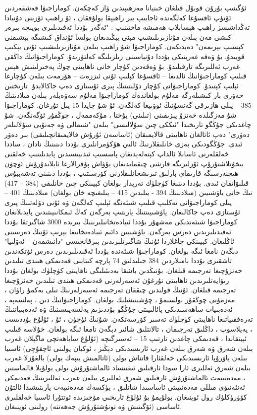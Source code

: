 \documentclass[a4paper]{article}
\begin{document}
ئۆگىنىپ بۇرۇن قوبۇل قىلغان خىنيانا مەزھىپىدىن ۋاز كەچكەن. كوماراجىۋا قەشقەردىن ئۆتۈپ ئاقسۇغا كەلگەندە ئاجايىپ بىر راھىپقا يولۇققان ، ئۇ راھىپ ئۆزىنى دۇنيادا تەڭداشىسز راھىپ ھېسابلاب ھەمىشە ماختىنىپ : "ئەگەر بۇددا ئەقىدىلىرى بويىچە بىرەر كىشى مەن بىلەن مۇنازىرىلىشىپ مېنى يېڭىدىغان بولسا ئۇنداق كىشىگە بېشىمنى كېسىپ بېرىمەن" دەيدىكەن. كوماراجىۋا شۇ راھىپ بىلەن مۇنازىرىلىشىپ ئۇنى يېڭىپ قويىدۇ. بۇ ۋەقە غەربتىكى بۇددا دۇنياسىنى زىلزىلىگە كەلتۈرىدۇ. كوماراجىۋانىڭ داڭقى غەرب ئەللىرىگە تارقىلىدۇ. بۇ ۋەقەدىن كۇچار خانى ناھايىتى چوڭ پەخىرلىنىش ھېس قىلىپ كوماراجىۋانىڭ ئالدىغا – ئاقسۇغا كېلىپ ئۇنى ئىززەت – ھۆرمەت بىلەن كۇچارغا ئېلىپ كېتىدۇ. كوماراجىۋانى كۇچار دۆلىتىنىڭ پىرى ئۇستازى دەپ جاكالايدۇ. تارىختىن خەۋرى بار كىشىلەرگە مەلۇم بولغاندەك كوماراجىۋا مەلۇم سەۋەبلەر بىلەن مىلادىنىڭ 385 – يىلى ھازىرقى گەنسۇنىڭ ئوۋىيغا كەلگەن. ئۇ شۇ جايدا 15 يىل تۇرغان. كوماراجىۋا شۇ مەزگىلدە خەنزۇ يېزىقىنى (تىلىنى) پۇختا ، مۇكەممەل ، چوڭقۇر ئۆگەنگەن. شۇ چاغدىكى جۇڭگو تارىخىدا "ئىككى چىن سۇلالىسى" بىلەن "شىمالى ۋە جەنۇبى سۇلالىلەر دەۋرى" دەپ ئاتالغان ناھايىتى قالايمىقان (ئاساسەن ئۇرۇش قالايمىقانچىلىقى) بىر دەۋر ئىدى. جۇڭگودىكى بەزى خانلىقلارنىڭ ئالىي ھۆكۈمرانلىرى بۇددا دىنىنىڭ نادان ، ساددا خەلقلەرنى ئاسانلا ئالداپ كېتەلەيدىغان پاسسىپ ئىدىيىسىدىن پايدىلىنىپ خەلقنى بىخۇتلاشتۇرۇپ ئۆزلىرىگە قارشى چىقمايدىغان يۇۋاش پۇقرالارغا ئايلاندۇرۇش ئۈچۈن ھىچنەرسىگە قارىماي بارلىق تىرىشچانلىقلارنى كۆرسىتىپ ، بۇددا دىنىنى تەشەببۇس قىلىۋاتقان ئىدى. بۇددا دىنىغا كۈچلۈك تەرپدار بولغان كېيىنكى چىن خانلىقى (384 – 417) نىڭ خانى ياۋشىيىن (مىلادىنىڭ 394 - يىلىدىن 415 – يىلىغىچە خان بولغان) مىلادىنىڭ 401 – يىلى كوماراجىۋانى تەكلىپ قىلىپ شىئەنگە ئېلىپ كەلگەن ۋە ئۇنى دۆلەتنىڭ پىرى ئۇستازى دەپ جاكالىغان. ياۋشىيىننىڭ يارىتىپ بەرگەن كەڭ ئىمكانىيىتىدىن پايدىلانغان كوماراجىۋا شىئەندىكى مەشھۇر بۇددا ئىبادەتخانىلىرىنىڭ بىرىدە 3000 شاگىرتقا بۇددا ئەقىدىلىرىدىن دەرس بەرگەن. ياۋشىيىن دائىم ئىبادەتخانىغا بېرىپ ئۇنىڭ دەرسىنى ئاڭلىغان. كېيىنكى چاغلاردا ئۇنىڭ شاگىرتلىرىدىن بىرقانچىسى "دانىشمەن – ئەۋلىيا" دېگەن نامغا ئىگە بولغان. كوماراجىۋا شىئەندە بۇددا ئەقىدىلىرىدىن دەرس ئۆتكەندىن تاشقىرى بۇددا نامىلاردىن 384 جىلىدلىق 74 پارچە كىتابنى قەدىمكى ھىندى تىلىدىن خەنزۇچىغا تەرجىمە قىلغان. بۇنىڭدىن باشقا بەدىئىلىگى ناھايىتى كۈچلۈك بولغان بۇددا رىۋايەتلىرىدىن ناھايىتى نۇرغۇن ئەسەرلەرنى قەدىمكى ھىندى تىلىدىن خەنزۇچىغا تەرجىمە قىلغان. ئۇنىڭ قولىدىن چىققان تەرجىمە ئەسەرلەرنىڭ تىلى بەكمۇ راۋان ، مەزمۇنى چوڭقۇر بولسىمۇ ، چۈشىنىشلىك بولغان. كوماراجىۋانىڭ دىن ، پەلسەپە ، ئەدەبىيات ساھەسىدىكى پائالىيىتى جۇڭگو بۇددىزىم پەلسەپىسىنىڭ ۋە ئەدەبىياتنىڭ تەرەققىياتىغا ناھايىتى كۈچلۈك تەسىر كۆرسەتكەن. شۇنىڭ ئۈچۈن ، ئۇ ، ئۇلۇغ بۇددىست ، پەيلاسوپ ، داڭلىق تەرجىمان ، تالانتلىق شائىر دېگەن نامغا ئىگە بولغان. خۇلاسە قىلىپ ئېيتقاندا ، قەدىمكى چاغدىن تارتىپ 15 – ئەسىرگىچە (ئۇلۇغ ساياھەتچى ماگېلان غەرب بىلەن شەرق ۋە شەرق بىلەن غەرب ئارىسىدىكى دېڭىز ، ئوكيان يولىنى ئاچقۇچى) ئاسىيا بىلەن ياۋرۇپا ئارىسىدىكى خەلقئارا قاتناش يولى (ئاتالمىش يىپەك يولى) يالغۇزلا غەرب بىلەن شەرق ئەللىرى ئارا سودا ئارقىلىق ئىقتىساد ئالماشتۇرۇش يولى بولۇپلا قالماستىن ، مەدەنىيەت ئالماشتۇرۇش ئارقىلىق شەرق ئەللىرى بىلەن غەرب ئەللىرىنىڭ قەدىمكى ئەنئەنىۋى مىللى مەدەنىيىتى ئاساسىدا شانلىق ، يۈكسەك مەدەنىيەت يارىتىشىدا ئالتۇن كۆۋرۈكلۈك رول ئوينىغان. بولۇپمۇ بۇ ئۇلۇغ تارىخىي مۆجىزىدە ئوتتۇرا ئاسىيا خەلقلىرى ئاساسى (ئۆگىتىش ۋە تونۇشتۇرۇش جەھەتتە) رولىنى ئوينىغان.
\end{document}
